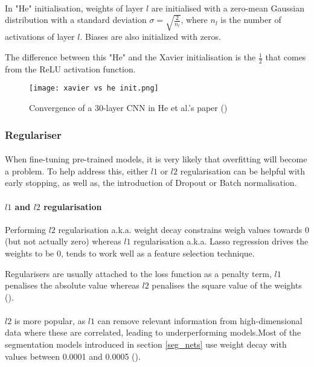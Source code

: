 \paragraph{}
In "He" initialisation, weights of layer $l$ are initialised with a zero-mean Gaussian distribution with a standard deviation  $\sigma =\sqrt{\frac{2}{n_l}}$, where $n_l$ is the number of activations of layer $l$. Biases are also initialized with zeros. 

The difference between this "He" and the Xavier initialisation  is the $\frac{1}{2}$ that comes from the \gls{ReLU} activation function.

\begin{figure}[hbt!]
    \centering
    \texttt{[image: xavier vs he init.png]}
    \caption{Convergence of a 30-layer \gls{CNN} in He et al.'s paper (\cite{He_2015_ICCV})}
    \label{fig_he_xavier}
\end{figure}

\subsubsection{Regulariser} \label{regulariser}
\paragraph{}
When fine-tuning pre-trained models, it is very likely that overfitting will become a problem. To help address this, either $l1$  or $l2$ regularisation can be helpful with early stopping, as well as, the introduction of Dropout or Batch normalisation.

\paragraph{$l1$ and $l2$ regularisation}
Performing $l2$ regularisation \gls{a.k.a.} weight decay constrains weigh values towards 0 (but not actually zero) whereas $l1$  regularisation \gls{a.k.a.} Lasso regression drives the weights to be $0$, tends to work well as a feature selection technique. 

Regularisers are usually attached to the loss function as a penalty term, $l1$ penalises the absolute value whereas $l2$ penalises the square value of the weights (\cite{shanmugamani2018deep}). 
\paragraph{}
$l2$  is more popular, as $l1$  can remove relevant information from high-dimensional data where these are correlated, leading to underperforming models.Most of the segmentation models introduced in section \ref{seg_nets} use weight decay with values between 0.0001 and 0.0005 (\cite{sultana2020106062}).


